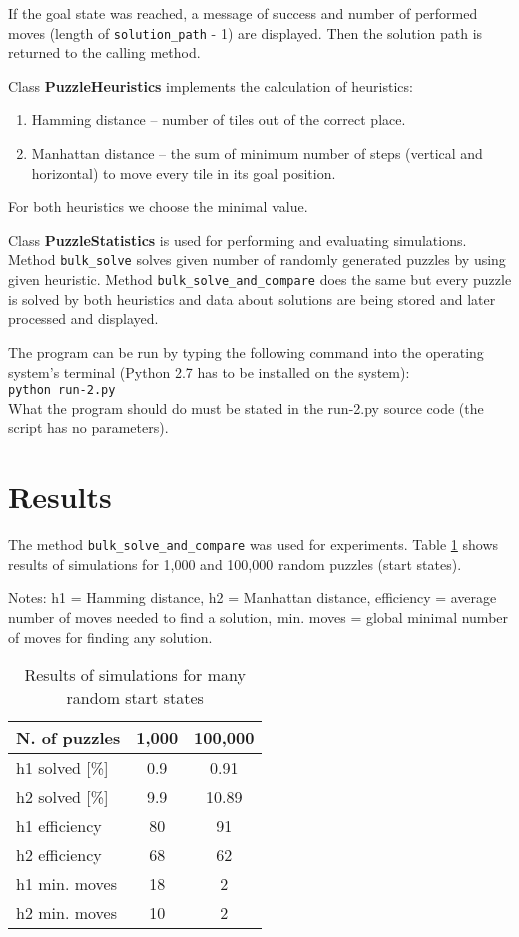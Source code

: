 \documentclass[a4paper]{article}
\begin{document}
If the goal state was reached, a message of success and number of performed moves (length of \texttt{solution\_path} - 1) are displayed. Then the solution path is returned to the calling method.

Class \textbf{PuzzleHeuristics} implements the calculation of heuristics:
\begin{enumerate}
\item Hamming distance -- number of tiles out of the correct place.
\item Manhattan distance -- the sum of minimum number of steps (vertical and horizontal) to move every tile in its goal position.
\end{enumerate}
For both heuristics we choose the minimal value. 

Class \textbf{PuzzleStatistics} is used for performing and evaluating simulations. Method \texttt{bulk\_solve} solves given number of randomly generated puzzles by using given heuristic. Method \verb|bulk_solve_and_compare| does the same but every puzzle is solved by both heuristics and data about solutions are being stored and later processed and displayed. 

The program can be run by typing the following command into the operating system's terminal (Python 2.7 has to be installed on the system): \\ 
\verb|python run-2.py| \\
What the program should do must be stated in the run-2.py source code (the script has no parameters).

\section{Results}

The method \verb|bulk_solve_and_compare| was used for experiments. Table \ref{table:simres} shows results of simulations for 1,000 and 100,000 random puzzles (start states). 

Notes: h1 = Hamming distance, h2 = Manhattan distance, efficiency = average number of moves needed to find a solution, min. moves = global minimal number of moves for finding any solution.

\renewcommand{\arraystretch}{1.5}
\begin{table}[h!]
\centering
\caption{Results of simulations for many random start states}
\label{table:simres}
\begin{tabular}{ | l | c| c|}
\hline
N. of puzzles & 1,000 & 100,000 \\ 
\hline
h1 solved [\%] & 0.9 & 0.91 \\
h2 solved [\%] & 9.9 & 10.89 \\
h1 efficiency & 80 & 91 \\
h2 efficiency & 68 & 62 \\
h1 min. moves & 18 & 2 \\
h2 min. moves & 10 & 2 \\
\hline
\end{tabular}
\end{table}
\end{document}
